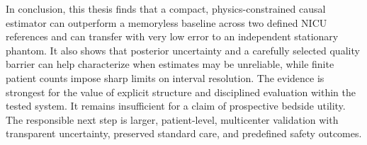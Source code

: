 In conclusion, this thesis finds that a compact, physics-constrained causal estimator can
outperform a memoryless baseline across two defined NICU references and can transfer with very
low error to an independent stationary phantom. It also shows that posterior uncertainty and a
carefully selected quality barrier can help characterize when estimates may be unreliable, while
finite patient counts impose sharp limits on interval resolution. The evidence is strongest for
the value of explicit structure and disciplined evaluation within the tested system. It remains
insufficient for a claim of prospective bedside utility. The responsible next step is larger,
patient-level, multicenter validation with transparent uncertainty, preserved standard care, and
predefined safety outcomes.
